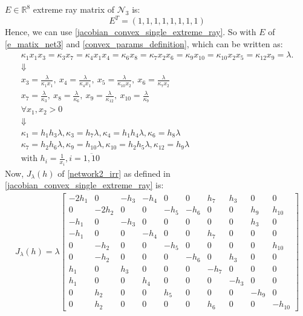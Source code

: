 $E \in \mathbb{R}^8$ extreme ray matrix of $\mathcal{N}_3$ is:
\begin{equation}\label{e_matix_net3}
	E^T=(1,1,1,1,1,1,1,1)
\end{equation}
Hence, we can use \ref{jacobian_convex_single_extreme_ray}. So with $E$ of \ref{e_matix_net3} and \ref{convex_params_definition}, which can be written as:
\begin{gather*}
	\kappa_1x_1x_3=\kappa_3x_7=\kappa_4x_1x_4=\kappa_6x_8=\kappa_7x_2x_6=\kappa_9x_{10}=\kappa_{10}x_2x_5=\kappa_{12}x_9=\lambda. \\
	\Downarrow \\
	x_{3} = \frac{\lambda}{\kappa_{1} x_{1}}, \ x_{4} = \frac{\lambda}{\kappa_{4} x_{1}}, \ x_{5} = \frac{\lambda}{\kappa_{10} x_{2}}, \ x_{6} = \frac{\lambda}{\kappa_{7} x_{2}} \\
	x_{7} = \frac{\lambda}{\kappa_{3}}, \ x_{8} = \frac{\lambda}{\kappa_{6}}, \ x_{9} = \frac{\lambda}{\kappa_{12}}, \ x_{10} = \frac{\lambda}{\kappa_{9}} \\
	\forall x_1, x_2 > 0 \\
	\Downarrow \\
	\kappa_{1} = h_{1} h_{3} \lambda, \kappa_{3} = h_{7} \lambda, \kappa_{4} = h_{1} h_{4} \lambda, \kappa_{6} = h_{8} \lambda \\
	\kappa_{7} = h_{2} h_{6} \lambda, \kappa_{9} = h_{10} \lambda, \kappa_{10} = h_{2} h_{5} \lambda, \kappa_{12} = h_{9} \lambda \\
	\text{with } h_i = \frac{1}{x_i} , i = \overline{1,10}
\end{gather*}
Now, $J_\lambda(h)$ of \ref{network2_irr} as defined in \ref{jacobian_convex_single_extreme_ray} is:
\begin{align}
	J_\lambda(h) = \lambda
	\left.\left[
		\begin{array}{rrrrrrrrrr}-2h_{1}&0&-h_{3}&-h_{4}&0&0&h_{7}&h_{3}&0&0\\0&-2h_{2}&0&0&-h_{5}&-h_{6}&0&0&h_{9}&h_{10}\\-h_{1}&0&-h_{3}&0&0&0&0&0&h_{3}&0\\-h_{1}&0&0&-h_{4}&0&0&h_{7}&0&0&0\\0&-h_{2}&0&0&-h_{5}&0&0&0&0&h_{10}\\0&-h_{2}&0&0&0&-h_{6}&0&h_{3}&0&0\\h_{1}&0&h_{3}&0&0&0&-h_{7}&0&0&0\\h_{1}&0&0&h_{4}&0&0&0&-h_{3}&0&0\\0&h_{2}&0&0&h_{5}&0&0&0&-h_{9}&0\\0&h_{2}&0&0&0&0&h_{6}&0&0&-h_{10}
	\end{array}\right.\right]
\end{align}
